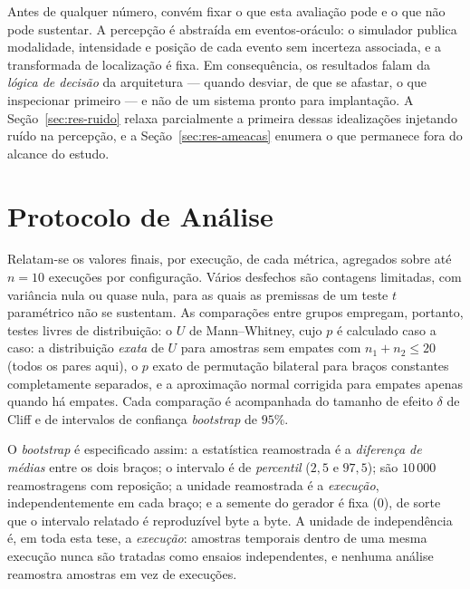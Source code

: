 Antes de qualquer número, convém fixar o que esta avaliação pode e o que não pode
sustentar. A percepção é abstraída em eventos-oráculo: o simulador publica
modalidade, intensidade e posição de cada evento sem incerteza associada, e a
transformada de localização é fixa. Em consequência, os resultados falam da
\emph{lógica de decisão} da arquitetura --- quando desviar, de que se afastar, o que
inspecionar primeiro --- e não de um sistema pronto para implantação. A
Seção~\ref{sec:res-ruido} relaxa parcialmente a primeira dessas idealizações
injetando ruído na percepção, e a Seção~\ref{sec:res-ameacas} enumera o que
permanece fora do alcance do estudo.

\section{Protocolo de Análise}
\label{sec:res-protocolo}

Relatam-se os valores finais, por execução, de cada métrica, agregados sobre até
$n=10$ execuções por configuração. Vários desfechos são contagens limitadas, com
variância nula ou quase nula, para as quais as premissas de um teste $t$ paramétrico
não se sustentam. As comparações entre grupos empregam, portanto, testes livres de
distribuição: o $U$ de Mann--Whitney, cujo $p$ é calculado caso a caso: a
distribuição \emph{exata} de $U$ para amostras sem empates com $n_1+n_2\le20$
(todos os pares aqui), o $p$ exato de permutação bilateral para braços constantes
completamente separados, e a aproximação normal corrigida para empates apenas quando
há empates. Cada comparação é acompanhada do tamanho de efeito $\delta$ de Cliff e de
intervalos de confiança \textit{bootstrap} de $95\%$.

O \textit{bootstrap} é especificado assim: a estatística reamostrada é a
\emph{diferença de médias} entre os dois braços; o intervalo é de \emph{percentil}
($2{,}5$ e $97{,}5$); são $10\,000$ reamostragens com reposição; a unidade reamostrada
é a \emph{execução}, independentemente em cada braço; e a semente do gerador é fixa
($0$), de sorte que o intervalo relatado é reproduzível byte a byte. A unidade de
independência é, em toda esta tese, a \emph{execução}: amostras temporais dentro de
uma mesma execução nunca são tratadas como ensaios independentes, e nenhuma análise
reamostra amostras em vez de execuções.

